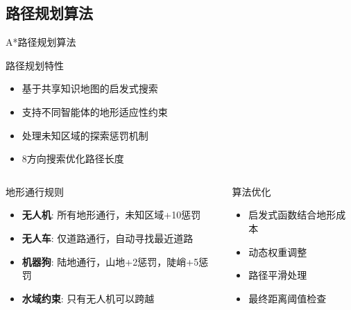 \documentclass[
10pt,
aspectratio=169,
]{beamer}
\begin{document}
\subsection{路径规划算法}

\begin{frame}{A*路径规划算法}
    \begin{block}{路径规划特性}
        \begin{itemize}
            \item 基于共享知识地图的启发式搜索
            \item 支持不同智能体的地形适应性约束
            \item 处理未知区域的探索惩罚机制
            \item 8方向搜索优化路径长度
        \end{itemize}
    \end{block}
    
    \begin{columns}
        \begin{column}{0.6\textwidth}
            \begin{exampleblock}{地形通行规则}
                \begin{itemize}
                    \item \textbf{无人机}: 所有地形通行，未知区域+10惩罚
                    \item \textbf{无人车}: 仅道路通行，自动寻找最近道路
                    \item \textbf{机器狗}: 陆地通行，山地+2惩罚，陡峭+5惩罚
                    \item \textbf{水域约束}: 只有无人机可以跨越
                \end{itemize}
            \end{exampleblock}
        \end{column}
        \begin{column}{0.4\textwidth}
            \begin{alertblock}{算法优化}
                \begin{itemize}
                    \item 启发式函数结合地形成本
                    \item 动态权重调整
                    \item 路径平滑处理
                    \item 最终距离阈值检查
                \end{itemize}
            \end{alertblock}
        \end{column}
    \end{columns}
\end{frame}
\end{document}
